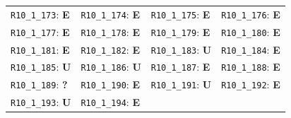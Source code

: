 \begin{longtable}{llll}
\texttt{R10\_1\_173}: \textbf{E} & \texttt{R10\_1\_174}: \textbf{E} & \texttt{R10\_1\_175}: \textbf{E} & \texttt{R10\_1\_176}: \textbf{E} \\
\texttt{R10\_1\_177}: \textbf{E} & \texttt{R10\_1\_178}: \textbf{E} & \texttt{R10\_1\_179}: \textbf{E} & \texttt{R10\_1\_180}: \textbf{E} \\
\texttt{R10\_1\_181}: \textbf{E} & \texttt{R10\_1\_182}: \textbf{E} & \texttt{R10\_1\_183}: \textbf{U} & \texttt{R10\_1\_184}: \textbf{E} \\
\texttt{R10\_1\_185}: \textbf{U} & \texttt{R10\_1\_186}: \textbf{U} & \texttt{R10\_1\_187}: \textbf{E} & \texttt{R10\_1\_188}: \textbf{E} \\
\texttt{R10\_1\_189}: \textbf{?} & \texttt{R10\_1\_190}: \textbf{E} & \texttt{R10\_1\_191}: \textbf{U} & \texttt{R10\_1\_192}: \textbf{E} \\
\texttt{R10\_1\_193}: \textbf{U} & \texttt{R10\_1\_194}: \textbf{E} &  &  \\
\bottomrule
\end{longtable}
